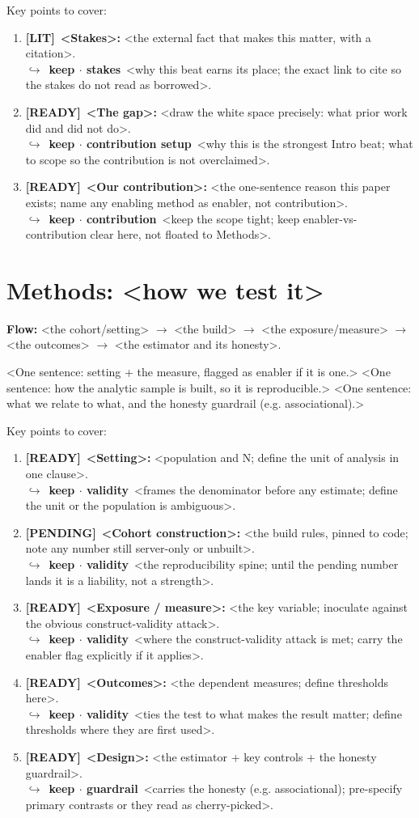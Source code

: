 \documentclass[11pt]{article}
\newcommand{\rdy}{\textcolor{cReady}{\textbf{[READY]}}}   %
\newcommand{\pend}{\textcolor{cPend}{\textbf{[PENDING]}}} %
\newcommand{\lit}{\textcolor{cLit}{\textbf{[LIT]}}}       %
\newcommand{\rev}[2]{\\{\footnotesize\color{gray}$\hookrightarrow$~\textbf{#1}~#2}}
\begin{document}
Key points to cover:
\begin{enumerate}
\item \lit~\textbf{<Stakes>:} <the external fact that makes this matter, with a citation>. \rev{keep $\cdot$ stakes}{<why this beat earns its place; the exact link to cite so the stakes do not read as borrowed>.}
\item \rdy~\textbf{<The gap>:} <draw the white space precisely: what prior work did and did not do>. \rev{keep $\cdot$ contribution setup}{<why this is the strongest Intro beat; what to scope so the contribution is not overclaimed>.}
\item \rdy~\textbf{<Our contribution>:} <the one-sentence reason this paper exists; name any enabling method as enabler, not contribution>. \rev{keep $\cdot$ contribution}{<keep the scope tight; keep enabler-vs-contribution clear here, not floated to Methods>.}
\end{enumerate}

\section*{Methods: <how we test it>}

\noindent\textbf{Flow:} <the cohort/setting> $\rightarrow$ <the build> $\rightarrow$ <the exposure/measure> $\rightarrow$ <the outcomes> $\rightarrow$ <the estimator and its honesty>.

<One sentence: setting + the measure, flagged as enabler if it is one.>
%
<One sentence: how the analytic sample is built, so it is reproducible.>
%
<One sentence: what we relate to what, and the honesty guardrail (e.g. associational).>

Key points to cover:
\begin{enumerate}
\item \rdy~\textbf{<Setting>:} <population and N; define the unit of analysis in one clause>. \rev{keep $\cdot$ validity}{<frames the denominator before any estimate; define the unit or the population is ambiguous>.}
\item \pend~\textbf{<Cohort construction>:} <the build rules, pinned to code; note any number still server-only or unbuilt>. \rev{keep $\cdot$ validity}{<the reproducibility spine; until the pending number lands it is a liability, not a strength>.}
\item \rdy~\textbf{<Exposure / measure>:} <the key variable; inoculate against the obvious construct-validity attack>. \rev{keep $\cdot$ validity}{<where the construct-validity attack is met; carry the enabler flag explicitly if it applies>.}
\item \rdy~\textbf{<Outcomes>:} <the dependent measures; define thresholds here>. \rev{keep $\cdot$ validity}{<ties the test to what makes the result matter; define thresholds where they are first used>.}
\item \rdy~\textbf{<Design>:} <the estimator + key controls + the honesty guardrail>. \rev{keep $\cdot$ guardrail}{<carries the honesty (e.g. associational); pre-specify primary contrasts or they read as cherry-picked>.}
\end{enumerate}
\end{document}
